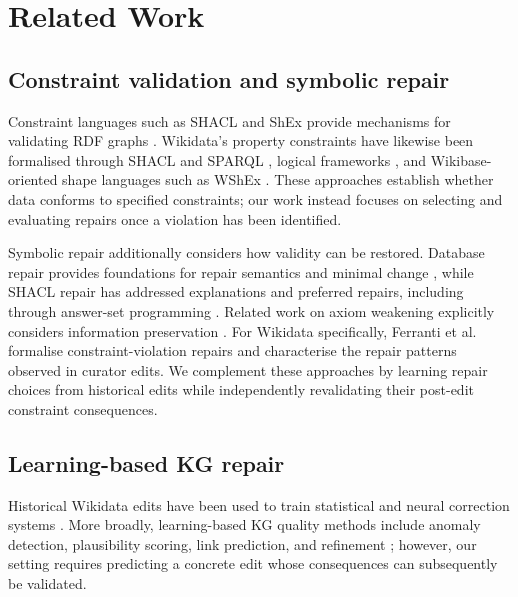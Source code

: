 \documentclass[a4paper,UKenglish,cleveref,autoref,thm-restate]{tgdk-v2021}
\begin{document}
\section{Related Work}
\label{sec:related-work}

\subsection{Constraint validation and symbolic repair}

Constraint languages such as SHACL and ShEx provide mechanisms for validating RDF graphs \cite{w3cSHACL2017,shex2019spec}. Wikidata's property constraints have likewise been formalised through SHACL and SPARQL \cite{ferranti2024formalizing}, logical frameworks \cite{martin2020mars,marx2017logic}, and Wikibase-oriented shape languages such as WShEx \cite{labra2022wshex}. These approaches establish whether data conforms to specified constraints; our work instead focuses on selecting and evaluating repairs once a violation has been identified.

Symbolic repair additionally considers how validity can be restored. Database repair provides foundations for repair semantics and minimal change \cite{bertossi2022database}, while SHACL repair has addressed explanations and preferred repairs, including through answer-set programming \cite{ahmetaj2021explanations,ahmetaj2022repairing,ahmetaj2025logic}. Related work on axiom weakening explicitly considers information preservation \cite{troquard2018weakening}. For Wikidata specifically, Ferranti et al.~\cite{ferranti2025repairs} formalise constraint-violation repairs and characterise the repair patterns observed in curator edits. We complement these approaches by learning repair choices from historical edits while independently revalidating their post-edit constraint consequences.

\subsection{Learning-based KG repair}

Historical Wikidata edits have been used to train statistical and neural correction systems \cite{pellissier2019learning,pellissier2021neural}. More broadly, learning-based KG quality methods include anomaly detection, plausibility scoring, link prediction, and refinement \cite{paulheim2017refinement,subagdja2024refining,zhang2022caged}; however, our setting requires predicting a concrete edit whose consequences can subsequently be validated.
\end{document}
